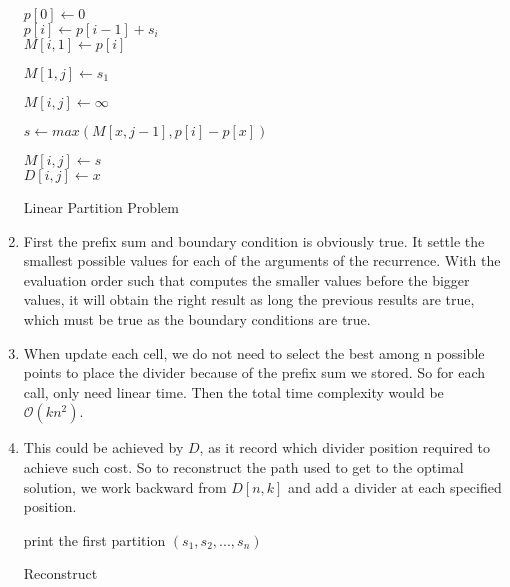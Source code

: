 \documentclass{assignment}
\begin{document}
\begin{homeworkProblem}
\begin{enumerate}
	
	\begin{algorithm}[H]
 \BlankLine
{}
$p[0]\leftarrow 0$  \\
 {
$p[i] \leftarrow p[i-1] + s_i$\\
}
 {
$M[i, 1] \leftarrow p[i]$ \\
}

 {
$M[1, j] \leftarrow s_1$ \\
}
 {
	 {
		$M[i, j] \leftarrow \infty$ \\
		 {
			$s \leftarrow max(M[x, j-1], p[i]-p[x]) $\\
			 {
			$M[i,j] \leftarrow s$ \\
			$D[i,j] \leftarrow x$ 
			
			}
		}
			
	}
}

\caption{Linear Partition Problem} \end{algorithm}
	
	
	\item First the prefix sum and boundary condition is obviously true. It settle the smallest possible values for each of the arguments of the recurrence. With the evaluation order such that computes the smaller values before the bigger values, it will obtain the right result as long the previous results are true, which must be true as the boundary conditions are true.
\item 	When update each cell, we do not need to select the best among n possible points to place the divider because of the prefix sum we stored. So for each call, only need linear time. Then the total time complexity would be $\mathcal{O}(kn^2)$.

\item This could be achieved by $D$, as it record which divider position required to achieve such cost. So to reconstruct the path used to get to the optimal solution, we work backward from $D[n,k]$ and add a divider at each specified position.

 
     \begin{algorithm}[H]
 \BlankLine
{} {
 {
print the first partition $(s_1, s_2, ..., s_n)$ \\
}
}

\caption{Reconstruct} \end{algorithm}
    
	
	\end{enumerate}
	
	\end{homeworkProblem}
\end{document}

